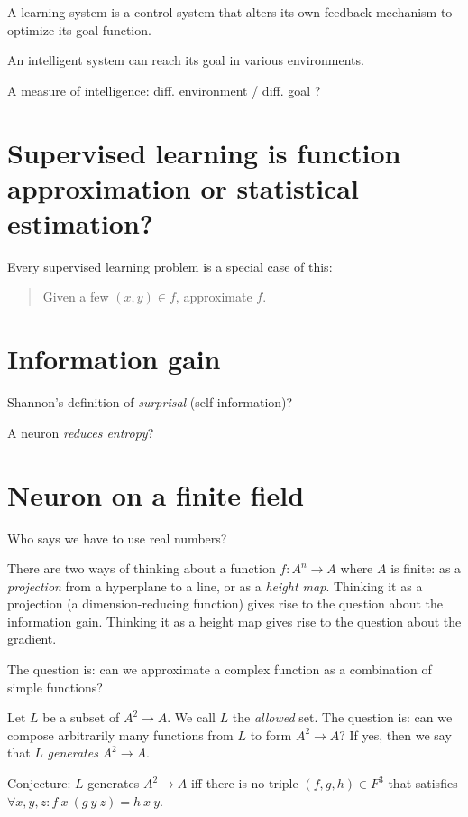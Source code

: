 A learning system is a control system that alters
its own feedback mechanism to optimize its goal function.

An intelligent system can reach its goal in various environments.

A measure of intelligence: diff. environment / diff. goal ?

\section{Supervised learning is function approximation or statistical estimation?}

Every supervised learning problem is a special case of this:
\begin{quote}
Given a few \((x,y) \in f\), approximate \(f\).
\end{quote}

\section{Information gain}

Shannon's definition of \emph{surprisal} (self-information)?

A neuron \emph{reduces entropy}?

\section{Neuron on a finite field}

Who says we have to use real numbers?

There are two ways of thinking about a function \(f : A^n \to A\) where \(A\) is finite:
as a \emph{projection} from a hyperplane to a line,
or as a \emph{height map}.
Thinking it as a projection (a dimension-reducing function)
gives rise to the question about the information gain.
Thinking it as a height map gives rise to the question about the gradient.

The question is: can we approximate a complex function as a combination of simple functions?

Let \(L\) be a subset of \( A^2 \to A \).
We call \(L\) the \emph{allowed} set.
The question is: can we compose arbitrarily many functions from \(L\)
to form \( A^2 \to A \)?
If yes, then we say that \(L\) \emph{generates} \( A^2 \to A \).

Conjecture: \(L\) generates \(A^2 \to A\) iff
there is no triple \((f,g,h)\in F^3\) that satisfies \( \forall x,y,z: f~x~(g~y~z) = h~x~y \).

